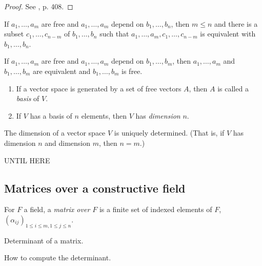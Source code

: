 {\begin{proof}
See \cite{TvD882}, p. 408.
\end{proof}

\begin{theorem}[Austauschsatz]
If $a_1, \ldots, a_m$ are free and $a_1, \ldots, a_m$ depend on $b_1,
\ldots, b_n$, then $m\leq n$ and there is a subset $c_1, \ldots,
c_{n-m}$ of $b_1, \ldots, b_n$ such that $a_1, \ldots, a_m, c_1, \ldots,
c_{n-m}$ is equivalent with  $b_1, \ldots, b_n$.
\end{theorem}

\begin{corollary}
If $a_1, \ldots, a_m$ are free and $a_1, \ldots, a_m$ depend on $b_1,
\ldots, b_m$, then $a_1, \ldots, a_m$ and $b_1, \ldots, b_m$ are
equivalent and $b_1, \ldots, b_m$ is free.
\end{corollary}

\begin{definition}
\begin{enumerate}
\item If a vector space is generated by a set of free vectors $A$,
then $A$ is called a {\em basis\/} of $V$.
\item If $V$ has a basis of $n$ elements, then $V$ has {\em
dimension\/} $n$.
\end{enumerate}
\end{definition}

\begin{lemma}
The dimension of a vector space $V$ is uniquely determined. (That is,
if $V$ has dimension $n$ and dimension $m$, then $n=m$.)
\end{lemma}

UNTIL HERE }

\subsection*{Matrices over a constructive field}

\begin{definition} For $F$ a field, a {\em matrix over $F$\/} is a
finite set of indexed elements of $F$, $(\alpha_{ij})_{1\leq i\leq m,
1\leq j\leq n}$.
\end{definition}


\begin{definition} Determinant of a matrix.
\end{definition}

\begin{lemma}
  How to compute the determinant.
\end{lemma}

